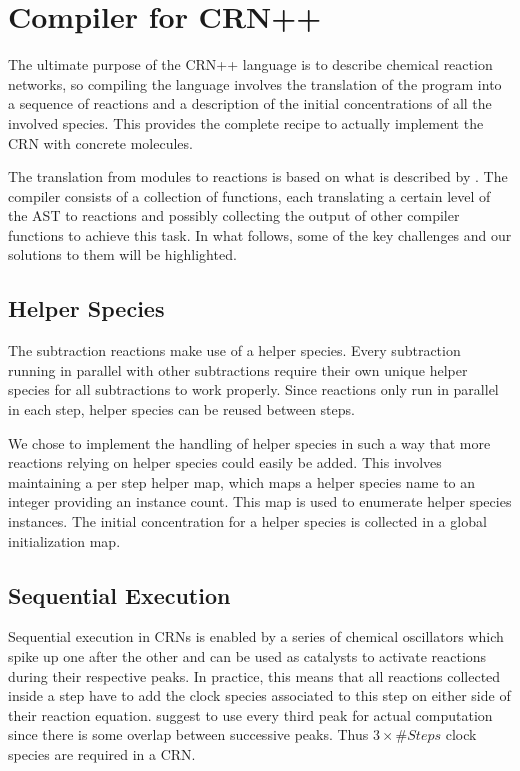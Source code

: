\section{Compiler for CRN++} %

The ultimate purpose of the CRN++ language is to describe chemical reaction networks, so compiling the language involves the translation of the program into a sequence of reactions and a description of the initial concentrations of all the involved species. This provides the complete recipe to actually implement the CRN with concrete molecules. 

The translation from modules to reactions is based on what is described by \citeauthor{soloveichik2018a} \cite{soloveichik2018a}. The compiler consists of a collection of functions, each translating a certain level of the AST to reactions and possibly collecting the output of other compiler functions to achieve this task. In what follows, some of the key challenges and our solutions to them will be highlighted.

\subsection{Helper Species}
The subtraction reactions make use of a helper species. Every subtraction running in parallel with other subtractions require their own unique helper species for all subtractions to work properly. Since reactions only run in parallel in each step, helper species can be reused between steps. 

We chose to implement the handling of helper species in such a way that more reactions relying on helper species could easily be added. This involves maintaining a per step helper map, which maps a helper species name to an integer providing an instance count. This map is used to enumerate helper species instances. The initial concentration for a helper species is collected in a global initialization map.

\subsection{Sequential Execution}
Sequential execution in CRNs is enabled by a series of chemical oscillators which spike up one after the other and can be used as catalysts to activate reactions during their respective peaks. In practice, this means that all reactions collected inside a step have to add the clock species associated to this step on either side of their reaction equation. \citeauthor{soloveichik2018a} suggest to use every third peak for actual computation since there is some overlap between successive peaks. Thus $3\times \#Steps$ clock species are required in a CRN.

